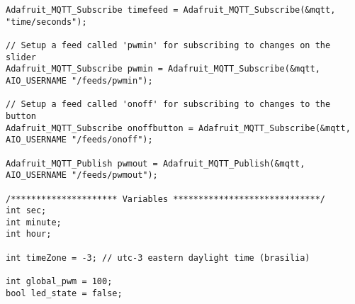 \begin{lstlisting}
Adafruit_MQTT_Subscribe timefeed = Adafruit_MQTT_Subscribe(&mqtt, "time/seconds");

// Setup a feed called 'pwmin' for subscribing to changes on the slider
Adafruit_MQTT_Subscribe pwmin = Adafruit_MQTT_Subscribe(&mqtt, AIO_USERNAME "/feeds/pwmin");

// Setup a feed called 'onoff' for subscribing to changes to the button
Adafruit_MQTT_Subscribe onoffbutton = Adafruit_MQTT_Subscribe(&mqtt, AIO_USERNAME "/feeds/onoff");

Adafruit_MQTT_Publish pwmout = Adafruit_MQTT_Publish(&mqtt, AIO_USERNAME "/feeds/pwmout");

/********************* Variables *****************************/
int sec;
int minute;
int hour;

int timeZone = -3; // utc-3 eastern daylight time (brasilia)

int global_pwm = 100;
bool led_state = false;

\end{lstlisting}